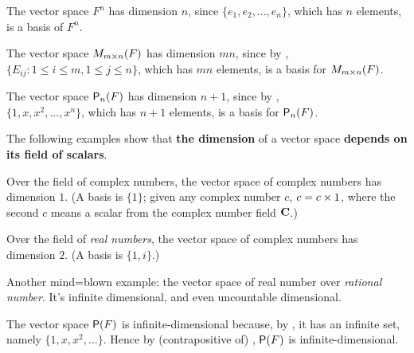 \begin{example} \label{example 1.6.8}
The vector space \(F^n\) has dimension \(n\), since \(\{ e_1, e_2, ..., e_n \}\), which has \(n\) elements, is a basis of \(F^n\).
\end{example}

\begin{example} \label{example 1.6.9}
The vector space \(M_{m \times n}(F)\) has dimension \(mn\), since by , \(\{ E_{ij} : 1 \le i \le m, 1 \le j \le n \}\), which has \(mn\) elements, is a basis for \(M_{m \times n}(F)\).
\end{example}

\begin{example} \label{example 1.6.10}
The vector space \(\textsf{P}_n(F)\) has dimension \(n + 1\), since by , \\
\(\{ 1, x, x^2, ..., x^n \}\), which has \(n + 1\) elements, is a basis for \(\textsf{P}_n(F)\).
\end{example}

The following examples show that \textbf{the dimension} of a vector space \textbf{depends on its field of scalars}.

\begin{example} \label{example 1.6.11}
Over the field of complex numbers, the vector space of complex numbers has dimension \(1\).
(A basis is \(\{ 1 \}\); given any complex number \(c\), \(c = c \times 1\), where the second \(c\) means a scalar from the complex number field \(\mathbf{C}\).)
\end{example}

\begin{example} \label{example 1.6.12}
Over the field of \textit{real numbers}, the vector space of complex numbers has dimension \(2\).
(A basis is \(\{ 1, i \}\).)
\end{example}

\begin{remark} \label{remark 1.6.4}
Another mind=blown example: the vector space of real number over \emph{rational number}.
It's infinite dimensional, and even uncountable dimensional.
\end{remark}

\begin{example} \label{example 1.6.13}
The vector space \(\textsf{P}(F)\) is infinite-dimensional because, by , it has an infinite \LID{} set, namely \(\{ 1, x, x^2, ... \}\).
Hence by (contrapositive of) , \(\textsf{P}(F)\) is infinite-dimensional.
\end{example}

